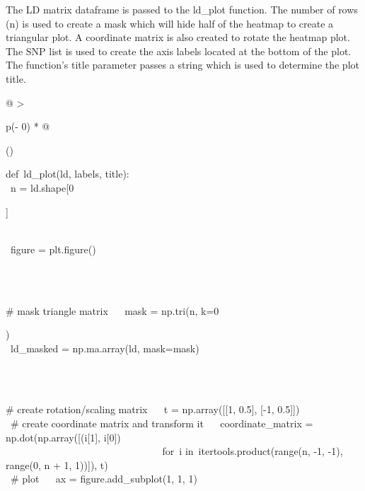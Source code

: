 \documentclass[12pt,a4paper]{article}
\begin{document}
{}

{The LD matrix dataframe is passed to the ld\_plot function. The number
of rows (n) is used to create a mask which will hide half of the heatmap
to create a triangular plot. A coordinate matrix is also created to
rotate the heatmap plot. The SNP list is used to create the axis labels
located at the bottom of the plot. The function's title parameter passes
a string which is used to determine the plot title.}

\protect\hypertarget{t.29a54725cd80635d2188dacbe57f49bc64d7b5b3}{}{}\protect\hypertarget{t.16}{}{}

\begin{longtable}[]{@{}
  >{\raggedright\arraybackslash}p{(\columnwidth - 0\tabcolsep) * }@{}}
\toprule()
\endhead
\begin{minipage}[t]{\linewidth}\raggedright
{def}{~}{ld\_plot}{(ld, labels, title):\\
\hspace*{0.333em} ~n = ld.shape{[}}{0}{{]}\\
\strut \\
\hspace*{0.333em} ~figure = plt.figure()\\
\strut \\
\hspace*{0.333em} ~}{\# mask triangle matrix}{\hfill\break
~ ~mask = np.tri(n, k=}{0}{)\\
\hspace*{0.333em} ~ld\_masked = np.ma.array(ld, mask=mask)\\
\strut \\
\hspace*{0.333em} ~}{\# create rotation/scaling matrix}{\hfill\break
~ ~t = np.array({[}{[}}{1}{, }{0.5}{{]}, {[}}{-1}{, }{0.5}{{]}{]})\\
\hspace*{0.333em} ~}{\# create coordinate matrix and transform
it}{\hfill\break
~ ~coordinate\_matrix = np.dot(np.array({[}(i{[}}{1}{{]},
i{[}}{0}{{]})\\
\hspace*{0.333em} ~ ~ ~ ~ ~ ~ ~ ~ ~ ~ ~ ~ ~ ~ ~ ~ ~ ~ ~ }{for}{~i
}{in}{~itertools.product(range(n, }{-1}{, }{-1}{), range(}{0}{, n +
}{1}{, }{1}{)){]}), t)\\
\hspace*{0.333em} ~}{\# plot}{\hfill\break
~ ~ax = figure.add\_subplot(}{1}{, }{1}{, }{1}{)\\
\hspace*{0.333em}
}
\end{minipage}
\end{longtable}
\end{document}
